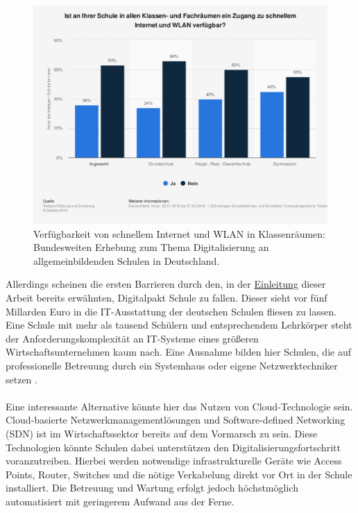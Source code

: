 \begin{figure}[H]
	\centering
	\includegraphics[width=0.9\linewidth]{bilder/statista_wlan}
	\caption[Verfügbarkeit von schnellem Internet und WLAN in Klassenräumen]{Verfügbarkeit von schnellem Internet und WLAN in Klassenräumen: Bundesweiten Erhebung zum Thema Digitalisierung an allgemeinbildenden Schulen in Deutschland. \cite{VBE2019}}
	\label{fig:statistawlan}
\end{figure}


Allerdings scheinen die ersten Barrieren durch den, in der  \hyperref[sec:einleitung]{Einleitung} dieser Arbeit bereits erwähnten, Digitalpakt Schule zu fallen. Dieser sieht vor fünf Millarden Euro in die IT-Ausstattung der deutschen Schulen fliesen zu lassen. Eine Schule mit mehr als tausend Schülern und entsprechendem Lehrkörper steht der Anforderungskomplexität an IT-Systeme eines größeren Wirtschaftsunternehmen kaum nach. Eine Ausnahme bilden hier Schulen, die auf professionelle Betreuung durch ein Systemhaus oder eigene Netzwerktechniker setzen \cite{Koenzen2018}. \\ \\ Eine interessante Alternative könnte hier das Nutzen von Cloud-Technologie sein. Cloud-basierte Netzwerkmanagementlösungen und Software-defined Networking (SDN) ist im Wirtschaftssektor bereits auf dem Vormarsch zu sein. Diese Technologien könnte Schulen dabei unterstützen den Digitalisierungsfortschritt voranzutreiben. Hierbei werden notwendige infrastrukturelle Geräte wie Access Points, Router, Switches und die nötige Verkabelung direkt vor Ort in der Schule installiert. Die Betreuung und Wartung erfolgt jedoch höchstmöglich automatisiert mit geringerem Aufwand aus der Ferne. 



